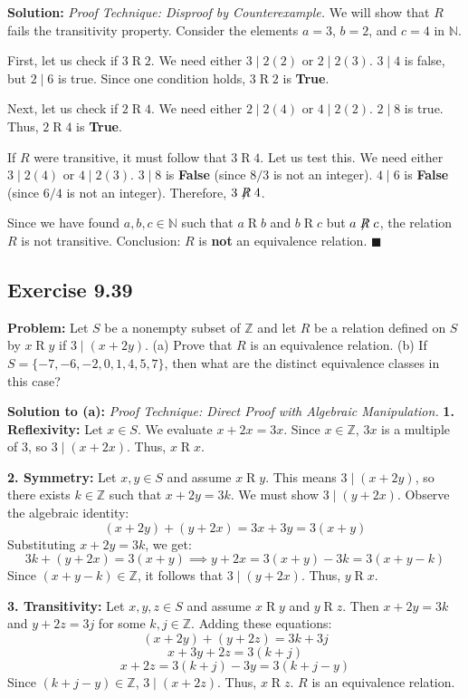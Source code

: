 \documentclass[11pt, a4paper]{article}
\theoremstyle{definition}
\theoremstyle{remark}
\newcommand{\N}{\mathbb{N}}
\newcommand{\Z}{\mathbb{Z}}
\begin{document}
\textbf{Solution:}
\textit{Proof Technique: Disproof by Counterexample.}
We will show that $R$ fails the transitivity property. 
Consider the elements $a = 3$, $b = 2$, and $c = 4$ in $\N$.

First, let us check if $3 \mathrel{R} 2$. We need either $3 \mid 2(2)$ or $2 \mid 2(3)$. 
$3 \mid 4$ is false, but $2 \mid 6$ is true. Since one condition holds, $3 \mathrel{R} 2$ is \textbf{True}.

Next, let us check if $2 \mathrel{R} 4$. We need either $2 \mid 2(4)$ or $4 \mid 2(2)$.
$2 \mid 8$ is true. Thus, $2 \mathrel{R} 4$ is \textbf{True}.

If $R$ were transitive, it must follow that $3 \mathrel{R} 4$. Let us test this. We need either $3 \mid 2(4)$ or $4 \mid 2(3)$.
$3 \mid 8$ is \textbf{False} (since $8/3$ is not an integer).
$4 \mid 6$ is \textbf{False} (since $6/4$ is not an integer).
Therefore, $3 \not\mathrel{R} 4$.

Since we have found $a, b, c \in \N$ such that $a \mathrel{R} b$ and $b \mathrel{R} c$ but $a \not\mathrel{R} c$, the relation $R$ is not transitive. 
Conclusion: $R$ is \textbf{not} an equivalence relation.
$\blacksquare$

\subsection*{Exercise 9.39}
\textbf{Problem:} Let $S$ be a nonempty subset of $\Z$ and let $R$ be a relation defined on $S$ by $x \mathrel{R} y$ if $3 \mid (x + 2y)$.
(a) Prove that $R$ is an equivalence relation.
(b) If $S = \{-7, -6, -2, 0, 1, 4, 5, 7\}$, then what are the distinct equivalence classes in this case?

\textbf{Solution to (a):}
\textit{Proof Technique: Direct Proof with Algebraic Manipulation.}
\textbf{1. Reflexivity:} Let $x \in S$. We evaluate $x + 2x = 3x$. Since $x \in \Z$, $3x$ is a multiple of 3, so $3 \mid (x + 2x)$. Thus, $x \mathrel{R} x$.

\textbf{2. Symmetry:} Let $x, y \in S$ and assume $x \mathrel{R} y$. This means $3 \mid (x + 2y)$, so there exists $k \in \Z$ such that $x + 2y = 3k$. We must show $3 \mid (y + 2x)$. 
Observe the algebraic identity:
\[
    (x + 2y) + (y + 2x) = 3x + 3y = 3(x + y)
\]
Substituting $x + 2y = 3k$, we get:
\[
    3k + (y + 2x) = 3(x + y) \implies y + 2x = 3(x + y) - 3k = 3(x + y - k)
\]
Since $(x + y - k) \in \Z$, it follows that $3 \mid (y + 2x)$. Thus, $y \mathrel{R} x$.

\textbf{3. Transitivity:} Let $x, y, z \in S$ and assume $x \mathrel{R} y$ and $y \mathrel{R} z$. 
Then $x + 2y = 3k$ and $y + 2z = 3j$ for some $k, j \in \Z$. Adding these equations:
\[
    (x + 2y) + (y + 2z) = 3k + 3j
\]
\[
    x + 3y + 2z = 3(k + j)
\]
\[
    x + 2z = 3(k + j) - 3y = 3(k + j - y)
\]
Since $(k + j - y) \in \Z$, $3 \mid (x + 2z)$. Thus, $x \mathrel{R} z$. $R$ is an equivalence relation.
\end{document}
